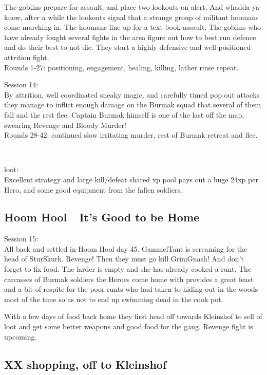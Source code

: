 The goblins prepare for assault, and place two lookouts on alert. And whadda-ya-know, after a while the lookouts signal that a strange group of militant hoomans come marching in. The hoomans line up for a text book assault. The goblins who have already fought several fights in the area figure out how to best run defence and do their best to not die. They start a highly defensive and well positioned attrition fight.\\
Rounds 1-27: positioning, engagement, healing, killing, lather rinse repeat.

Session 14:\\
By attrition, well coordinated sneaky magic, and carefully timed pop out attacks they manage to inflict enough damage on the Burmak squad that several of them fall and the rest flee. Captain Burmak himself is one of the last off the map, swearing Revenge and Bloody Murder!\\
Rounds 28-42: continued slow irritating murder, rest of Burmak retreat and flee.

\

loot:\\
Excellent strategy and large kill/defeat shared xp pool pays out a huge 24xp per Hero, and some good equipment from the fallen soldiers.




\subsection*{Hoom Hool~\mdash~It's Good to be Home}

\forceindent Session 15:\\                                              %
All back and settled in Hoom Hool day 45. GammelTant is screaming for the head of SturSkurk. Revenge! Then they must go kill GrimGnash! And don't forget to fix food. The larder is empty and she has already cooked a runt.
The carcasses of Burmak soldiers the Heroes come home with provides a great feast and a bit of respite for the poor runts who had taken to hiding out in the woods most of the time so as not to end up swimming dead in the cook pot.

With a few days of food back home they first head off towards Kleinshof to sell of loot and get some better weapons and good food for the gang. Revenge fight is upcoming.


\subsection*{XX shopping, off to Kleinshof}

